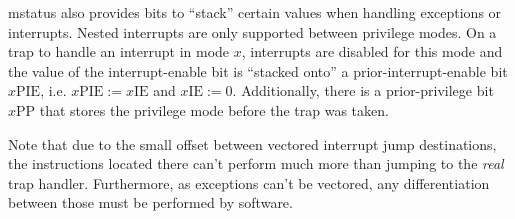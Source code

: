 \gls{mstatus} also provides bits to \enquote{stack} certain values when handling exceptions or interrupts.
Nested interrupts are only supported between privilege modes.
On a trap to handle an interrupt in mode $ x $, interrupts are disabled for this mode and the value of the interrupt-enable bit is \enquote{stacked onto} a prior-interrupt-enable bit $x\text{PIE} $, i.e. $ x\text{PIE} := x\text{IE} $ and $ x\text{IE} := 0 $.
Additionally, there is a prior-privilege bit $ x\text{PP} $ that stores the privilege mode before the trap was taken.

Note that due to the small offset between vectored interrupt jump destinations, the instructions located there can't perform much more than jumping to the \textit{real} trap handler.
Furthermore, as exceptions can't be vectored, any differentiation between those must be performed by software.

